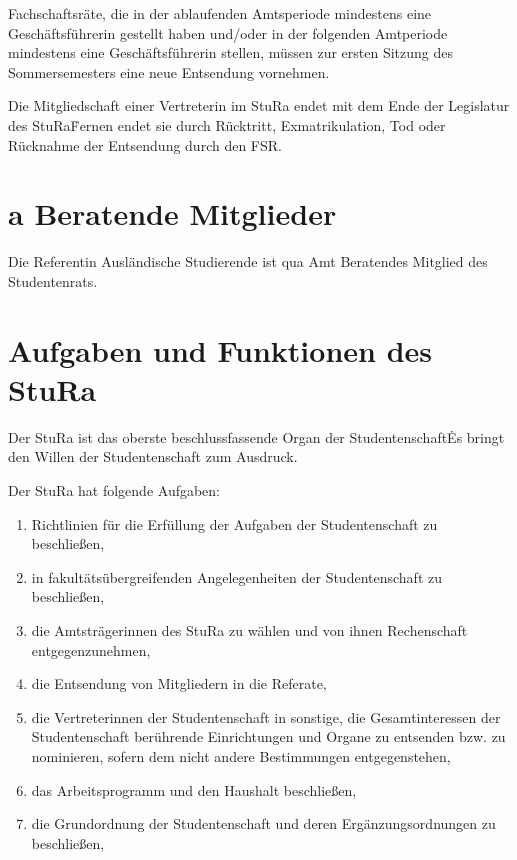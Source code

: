 \begin{multicols}{2}
\Abs \Satz Fachschaftsräte, die in der ablaufenden Amtsperiode mindestens eine Geschäftsführerin gestellt haben und/oder in der folgenden Amtperiode mindestens eine Geschäftsführerin stellen, müssen zur ersten Sitzung des Sommersemesters eine neue Entsendung vornehmen.

\Abs \Satz Die Mitgliedschaft einer Vertreterin im StuRa endet mit dem Ende der Legislatur des StuRa\. Fernen endet sie durch Rücktritt, Exmatrikulation, Tod oder Rücknahme der Entsendung durch den FSR.


\setcounter{section}{14}
\section{a Beratende Mitglieder}
\Abs \Satz Die Referentin Ausländische Studierende ist qua Amt Beratendes Mitglied des Studentenrats.
\setcounter{section}{15}


\section{Aufgaben und Funktionen des StuRa} %

\Abs \Satz Der StuRa ist das oberste beschlussfassende Organ der Studentenschaft\. Es bringt den Willen der Studentenschaft zum Ausdruck.

\Abs \Satz Der StuRa hat folgende Aufgaben:
\begin{enumerate}
\item Richtlinien für die Erfüllung der Aufgaben der Studentenschaft zu beschließen,
\item in fakultätsübergreifenden Angelegenheiten der Studentenschaft zu beschließen,
\item die Amtsträgerinnen des StuRa zu wählen und von ihnen Rechenschaft entgegenzunehmen,
\item die Entsendung von Mitgliedern in die Referate,
\item die Vertreterinnen der Studentenschaft in sonstige, die Gesamtinteressen der Studentenschaft berührende Einrichtungen und Organe zu entsenden bzw. zu nominieren, sofern dem nicht andere Bestimmungen entgegenstehen,
\item das Arbeitsprogramm und den Haushalt beschließen,
\item die Grundordnung der Studentenschaft und deren Ergänzungsordnungen zu beschließen,
\end{enumerate}


\end{multicols}
